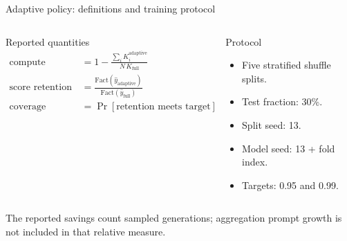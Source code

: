 \documentclass[aspectratio=169,10pt]{beamer}
\newcommand{\Kfull}{K_{\mathrm{full}}}
\begin{document}
\begin{frame}{Adaptive policy: definitions and training protocol}
  \begin{columns}[T,onlytextwidth]
      \begin{block}{Reported quantities}\small
        \begin{align*}
          \text{compute savings}
            &= 1-\frac{\sum_i K_i^{\mathrm{adaptive}}}{N\,\Kfull}\\[-2pt]
          \text{score retention}
            &= \frac{\mathrm{Fact}(\hat y_{\mathrm{adaptive}})}
                    {\mathrm{Fact}(\hat y_{\mathrm{full}})}\\[-2pt]
          \text{coverage}
            &= \Pr[\text{retention meets target}]
        \end{align*}
      \end{block}
      \begin{block}{Protocol}\small
        \begin{itemize}
          \item Five stratified shuffle splits.
          \item Test fraction: 30\%.
          \item Split seed: 13.
          \item Model seed: 13 + fold index.
          \item Targets: 0.95 and 0.99.
        \end{itemize}
      \end{block}
  \end{columns}
  \vspace{5pt}
  \centering
  \small The reported savings count sampled generations; aggregation prompt growth is not included in that relative measure.
\end{frame}
\end{document}
